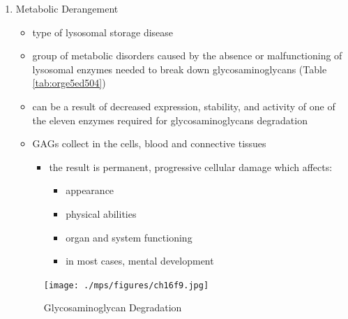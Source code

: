 \documentclass{scrartcl}
\begin{document}
\begin{enumerate}
\item Metabolic Derangement
\label{sec:orgd4c2966}
\begin{itemize}
\item type of lysosomal storage disease
\item group of metabolic disorders caused by the absence or malfunctioning
of lysosomal enzymes needed to break down glycosaminoglycans (Table \ref{tab:orge5ed504})
\item can be a result of decreased expression, stability, and activity of
one of the eleven enzymes required for glycosaminoglycans
degradation
\item GAGs collect in the cells, blood and connective tissues
\begin{itemize}
\item the result is permanent, progressive cellular damage which affects:
\begin{itemize}
\item appearance
\item physical abilities
\item organ and system functioning
\item in most cases, mental development
\end{itemize}
\end{itemize}
\end{itemize}

\begin{figure}[htbp]
\centering
\texttt{[image: ./mps/figures/ch16f9.jpg]}
\caption[Glycosaminoglycan Degradation]{\label{fig:org4db5e24}
Glycosaminoglycan Degradation}
\end{figure}


\end{enumerate}
\end{document}
